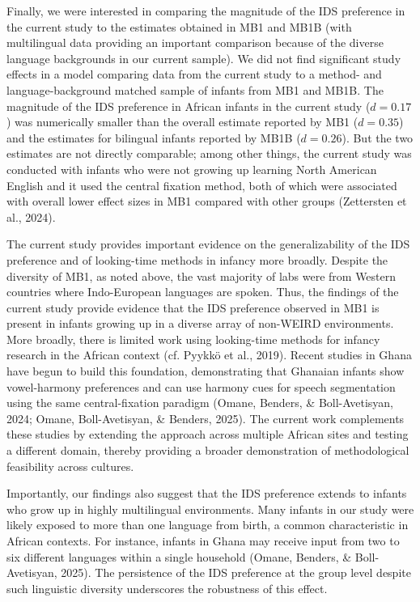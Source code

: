 \documentclass[
  ,man,floatsintext]{apa6}
\begin{document}
Finally, we were interested in comparing the magnitude of the IDS preference in the current study to the estimates obtained in MB1 and MB1B (with multilingual data providing an important comparison because of the diverse language backgrounds in our current sample). We did not find significant study effects in a model comparing data from the current study to a method- and language-background matched sample of infants from MB1 and MB1B. The magnitude of the IDS preference in African infants in the current study (\(d = 0.17\)) was numerically smaller than the overall estimate reported by MB1 (\(d = 0.35\)) and the estimates for bilingual infants reported by MB1B (\(d = 0.26\)). But the two estimates are not directly comparable; among other things, the current study was conducted with infants who were not growing up learning North American English and it used the central fixation method, both of which were associated with overall lower effect sizes in MB1 compared with other groups (Zettersten et al., 2024).

The current study provides important evidence on the generalizability of the IDS preference and of looking-time methods in infancy more broadly. Despite the diversity of MB1, as noted above, the vast majority of labs were from Western countries where Indo-European languages are spoken. Thus, the findings of the current study provide evidence that the IDS preference observed in MB1 is present in infants growing up in a diverse array of non-WEIRD environments. More broadly, there is limited work using looking-time methods for infancy research in the African context (cf. Pyykkö et al., 2019). Recent studies in Ghana have begun to build this foundation, demonstrating that Ghanaian infants show vowel-harmony preferences and can use harmony cues for speech segmentation using the same central-fixation paradigm (Omane, Benders, \& Boll-Avetisyan, 2024; Omane, Boll-Avetisyan, \& Benders, 2025). The current work complements these studies by extending the approach across multiple African sites and testing a different domain, thereby providing a broader demonstration of methodological feasibility across cultures.

Importantly, our findings also suggest that the IDS preference extends to infants who grow up in highly multilingual environments. Many infants in our study were likely exposed to more than one language from birth, a common characteristic in African contexts. For instance, infants in Ghana may receive input from two to six different languages within a single household (Omane, Benders, \& Boll-Avetisyan, 2025). The persistence of the IDS preference at the group level despite such linguistic diversity underscores the robustness of this effect.
\end{document}

